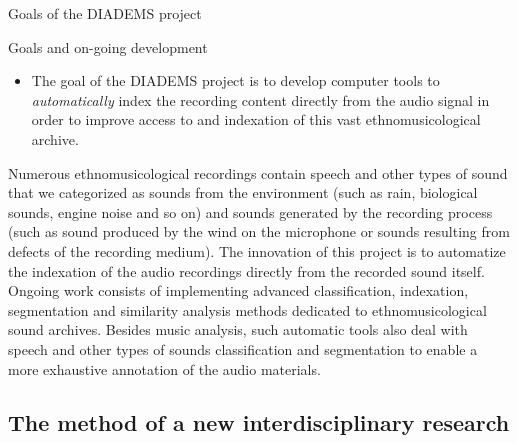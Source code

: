 \documentclass[final, hyperref, table]{beamer}
\begin{document}
\begin{frame}{Goals of the DIADEMS project}
\tiny  
 \begin{block}{Goals and on-going development}
    \begin{itemize}
    \item The goal of the DIADEMS project is to develop computer tools
      to \emph{automatically} index the recording content directly
      from the audio signal in order to improve access to and
      indexation of this vast ethnomusicological archive.

    \end{itemize}

    Numerous ethnomusicological recordings contain speech and other
    types of sound that we categorized as sounds from the environment
    (such as rain, biological sounds, engine noise and so on) and
    sounds generated by the recording process (such as sound produced
    by the wind on the microphone or sounds resulting from defects of
    the recording medium). The innovation of this project is to
    automatize the indexation of the audio recordings directly from
    the recorded sound itself.  Ongoing work consists of implementing
    advanced classification, indexation, segmentation and similarity
    analysis methods dedicated to ethnomusicological sound archives.
    Besides music analysis, such automatic tools also deal with speech
    and other types of sounds classification and segmentation to
    enable a more exhaustive annotation of the audio materials.
  \end{block}
\end{frame}

\subsection{The method of a new interdisciplinary research}
\end{document}
